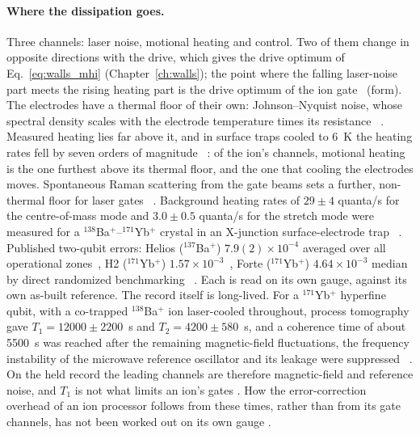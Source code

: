 \paragraph{Where the dissipation goes.} Three channels: laser noise, motional heating and control. Two of them
change in opposite directions with the drive, which gives the drive optimum of Eq.~\eqref{eq:walls_mhi} (Chapter~\ref{ch:walls}); the point
where the falling laser-noise part meets the rising heating part is the drive optimum of the ion gate \conjecture\ (form).
The electrodes have a thermal floor of their own: Johnson--Nyquist noise, whose spectral density scales with the electrode temperature
times its resistance~\cite{Brownnutt2015} \derived. Measured heating lies far above it, and in surface traps cooled to 6~K the heating
rates fell by seven orders of magnitude~\cite{Labaziewicz2008} \observed: of the ion's channels, motional heating is the one furthest above
its thermal floor, and the one that cooling the electrodes moves. Spontaneous Raman scattering from the gate beams sets a further,
non-thermal floor for laser gates~\cite{Ozeri2007} \observed. Background heating rates of $29\pm4$ quanta/s for the centre-of-mass mode and
$3.0\pm0.5$ quanta/s for the stretch mode were measured for a $^{138}$Ba$^+$--$^{171}$Yb$^+$ crystal in an X-junction surface-electrode
trap~\cite{Burton2023} \observed. Published two-qubit errors: Helios ($^{137}$Ba$^+$) $7.9(2)\times10^{-4}$ averaged over all operational
zones~\cite{Ransford2025}, H2 ($^{171}$Yb$^+$) $1.57\times10^{-3}$~\cite{DeCross2025}, Forte ($^{171}$Yb$^+$) $4.64\times10^{-3}$ median by direct
randomized benchmarking~\cite{Chen2024Forte} \observed. Each is read on its own gauge, against its own as-built reference. The record itself is long-lived. For a $^{171}$Yb$^+$ hyperfine qubit, with a co-trapped $^{138}$Ba$^+$ ion laser-cooled throughout,
process tomography gave $T_1=12000\pm2200$~s and $T_2=4200\pm580$~s, and a coherence time of about 5500~s was reached after the
remaining magnetic-field fluctuations, the frequency instability of the microwave reference oscillator and its leakage were
suppressed~\cite{WangYb2021} \observed. On the held record the leading channels are therefore magnetic-field and reference noise, and
$T_1$ is not what limits an ion's gates \interp. How the error-correction overhead of an ion processor follows from these times, rather
than from its gate channels, has not been worked out on its own gauge \openprob.

